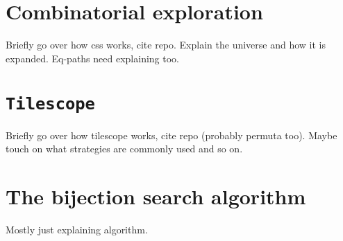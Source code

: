 
\label{ch:search}
\section{Combinatorial exploration}
Briefly go over how css works, cite repo. Explain the universe and how it is expanded. Eq-paths need explaining too.
\section{\texttt{Tilescope}}
Briefly go over how tilescope works, cite repo (probably permuta too). Maybe touch on what strategies are commonly used and so on.
\section{The bijection search algorithm}
Mostly just explaining algorithm. 